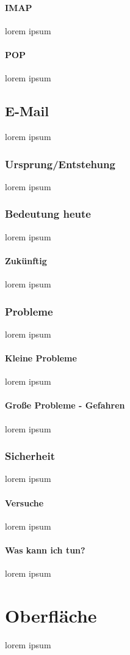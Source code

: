 \documentclass[12pt,a4paper]{report}
\begin{document}
\paragraph{IMAP}
lorem ipsum
\paragraph{POP}
lorem ipsum
\subsection{E-Mail}
lorem ipsum
\subsubsection{Ursprung/Entstehung}
lorem ipsum
\subsubsection{Bedeutung heute}
lorem ipsum
\paragraph{Zukünftig}
lorem ipsum
\subsubsection{Probleme}
lorem ipsum
\paragraph{Kleine Probleme}
lorem ipsum
\paragraph{Große Probleme - Gefahren}
lorem ipsum
\subsubsection{Sicherheit}
lorem ipsum
\paragraph{Versuche}
lorem ipsum
\paragraph{Was kann ich tun?}
lorem ipsum

\section{Oberfläche}
lorem ipsum
\end{document}
